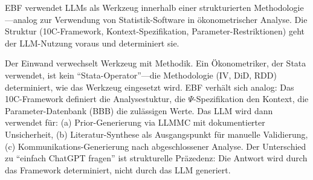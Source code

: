 \begin{tcolorbox}[colback=green!5!white, colframe=green!75!black,
    title=P1-$\mathcal{W}$-K: Kurz (Wissenschaft)]

EBF verwendet LLMs als Werkzeug innerhalb einer strukturierten Methodologie---analog zur Verwendung von Statistik-Software in ökonometrischer Analyse. Die Struktur (10C-Framework, Kontext-Spezifikation, Parameter-Restriktionen) geht der LLM-Nutzung voraus und determiniert sie.

\end{tcolorbox}

\begin{tcolorbox}[colback=green!5!white, colframe=green!75!black,
    title=P1-$\mathcal{W}$-M: Mittel (Wissenschaft)]

Der Einwand verwechselt Werkzeug mit Methodik. Ein Ökonometriker, der Stata verwendet, ist kein ``Stata-Operator''---die Methodologie (IV, DiD, RDD) determiniert, wie das Werkzeug eingesetzt wird. EBF verhält sich analog: Das 10C-Framework definiert die Analysestuktur, die $\Psi$-Spezifikation den Kontext, die Parameter-Datenbank (BBB) die zulässigen Werte. Das LLM wird dann verwendet für: (a) Prior-Generierung via LLMMC mit dokumentierter Unsicherheit, (b) Literatur-Synthese als Ausgangspunkt für manuelle Validierung, (c) Kommunikations-Generierung nach abgeschlossener Analyse. Der Unterschied zu ``einfach ChatGPT fragen'' ist strukturelle Präzedenz: Die Antwort wird durch das Framework determiniert, nicht durch das LLM generiert.

\end{tcolorbox}

